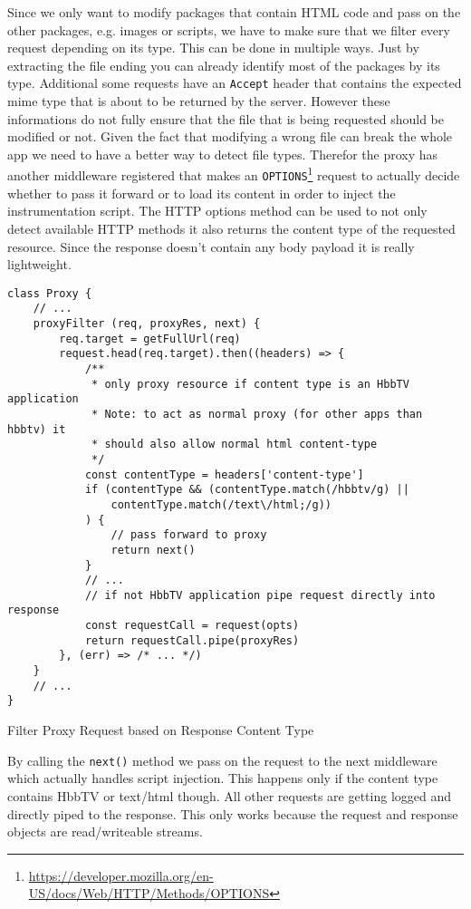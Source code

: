 Since we only want to modify packages that contain HTML code and pass on the other packages, e.g. images
or scripts, we have to make sure that we filter every request depending on its type. This can be done in
multiple ways. Just by extracting the file ending you can already identify most of the packages by its
type. Additional some requests have an \texttt{Accept} header that contains the expected mime type that
is about to be returned by the server. However these informations do not fully ensure that the file that
is being requested should be modified or not. Given the fact that modifying a wrong file can break the
whole app we need to have a better way to detect file types. Therefor the proxy has another middleware
registered that makes an \texttt{OPTIONS}\footnote{\url{https://developer.mozilla.org/en-US/docs/Web/HTTP/Methods/OPTIONS}}
request to actually decide whether to pass it forward or to load its content in order to inject the
instrumentation script. The HTTP options method can be used to not only detect available HTTP methods
it also returns the content type of the requested resource. Since the response doesn't contain any body
payload it is really lightweight.

\begin{listing}[H]
\begin{verbatim}
class Proxy {
    // ...
    proxyFilter (req, proxyRes, next) {
        req.target = getFullUrl(req)
        request.head(req.target).then((headers) => {
            /**
             * only proxy resource if content type is an HbbTV application
             * Note: to act as normal proxy (for other apps than hbbtv) it
             * should also allow normal html content-type
             */
            const contentType = headers['content-type']
            if (contentType && (contentType.match(/hbbtv/g) ||
                contentType.match(/text\/html;/g))
            ) {
                // pass forward to proxy
                return next()
            }
            // ...
            // if not HbbTV application pipe request directly into response
            const requestCall = request(opts)
            return requestCall.pipe(proxyRes)
        }, (err) => /* ... */)
    }
    // ...
}
\end{verbatim}
\caption{Filter Proxy Request based on Response Content Type}
\label{lst:proxyFilter}
\end{listing}

By calling the \texttt{next()} method we pass on the request to the next middleware which actually handles
script injection. This happens only if the content type contains HbbTV or text/html though. All other
requests are getting logged and directly piped to the response. This only works because the request and
response objects are read/writeable streams.


